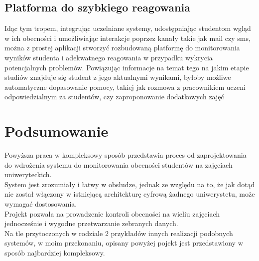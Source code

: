 \documentclass[declaration,shortabstract, mgr]{iithesis}
\begin{document}
\section{Platforma do szybkiego reagowania}
\indent Idąc tym tropem, integrując uczelniane systemy, udostępniając studentom wgląd w ich obecności i umożliwiając interakcje poprzez kanały takie jak mail czy sms, można z prostej aplikacji stworzyć rozbudowaną platformę do monitorowania wyników studenta i adekwatnego reagowania w przypadku wykrycia potencjalnych problemów. Powiązując informacje na temat tego na jakim etapie studiów znajduje się student z jego aktualnymi wynikami, byłoby możliwe automatyczne dopasowanie pomocy, takiej jak rozmowa z pracownikiem uczeni odpowiedzialnym za studentów, czy zaproponowanie dodatkowych zajęć

\chapter{Podsumowanie}
\indent Powyższa praca w kompleksowy sposób przedstawia proces od zaprojektowania do wdrożenia systemu do monitorowania obecności studentów na zajęciach uniweryteckich. \\
\indent System jest zrozumiały i łatwy w obsłudze, jednak ze względu na to, że jak dotąd nie został włączony w istniejącą architekturę cyfrową żadnego uniwerystetu, może wymagać dostosowania. \\
\indent Projekt pozwala na prowadzenie kontroli obecności na wieliu zajęciach jednocześnie i wygodne przetwarzanie zebranych danych.\\
\indent Na tle przytoczonych w rodziale 2 przykładów innych realizacji podobnych systemów, w moim przekonaniu, opisany powyżej pojekt jest przedstawiony w sposób najbardziej kompleksowy.
\end{document}
